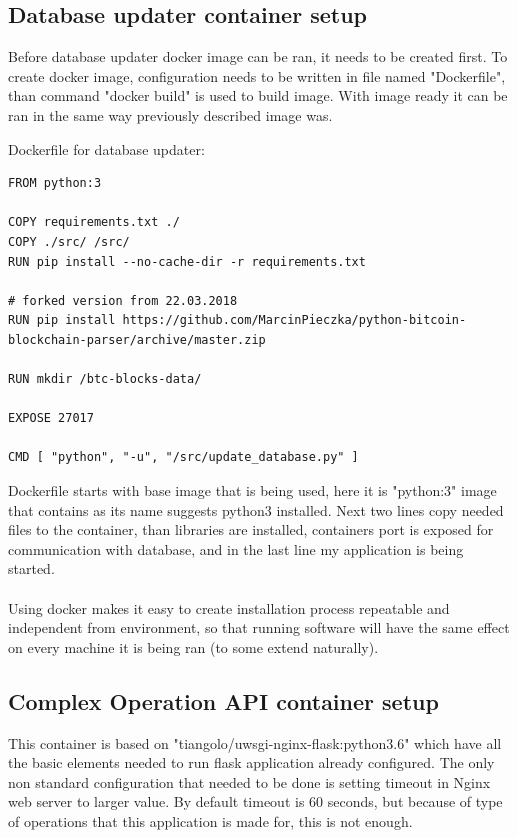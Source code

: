 \documentclass[12pt, en, eng, oneside, final]{mgr}
\begin{document}
\subsection{Database updater container setup}
Before database updater docker image can be ran, it needs to be created first. To create docker image, configuration needs to be written in file named "Dockerfile", than command "docker build" is used to build image. With image ready it can be ran in the same way previously described image was.

Dockerfile for database updater:
\begin{verbatim}
FROM python:3

COPY requirements.txt ./
COPY ./src/ /src/
RUN pip install --no-cache-dir -r requirements.txt

# forked version from 22.03.2018
RUN pip install https://github.com/MarcinPieczka/python-bitcoin-blockchain-parser/archive/master.zip

RUN mkdir /btc-blocks-data/

EXPOSE 27017

CMD [ "python", "-u", "/src/update_database.py" ]
\end{verbatim}

Dockerfile starts with base image that is being used, here it is "python:3"\cite{python3} image that contains as its name suggests python3 installed.
Next two lines copy needed files to the container, than libraries are installed, containers port is exposed for communication with database, and in the last line my application is being started.
\\
\\
Using docker makes it easy to create installation process repeatable and independent from environment, so that running software will have the same effect on every machine it is being ran (to some extend naturally). 

\subsection{Complex Operation API container setup}
This container is based on "tiangolo/uwsgi-nginx-flask:python3.6"\cite{flask} which have all the basic elements needed to run flask application already configured. The only non standard configuration that needed to be done is setting timeout in Nginx\cite{nginx} web server to larger value. By default timeout is 60 seconds, but because of type of operations that this application is made for, this is not enough.  
\end{document}
